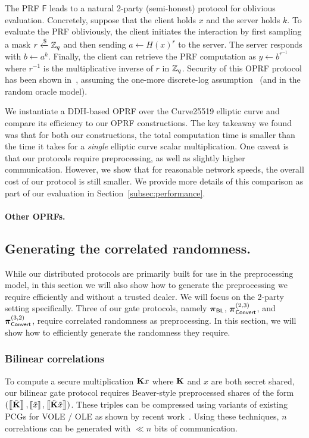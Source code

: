 The PRF $\mathsf{F}$ leads to a natural 2-party (semi-honest) protocol for oblivious evaluation. Concretely, suppose that the client holds $x$ and the server holds $k$. To evaluate the PRF obliviously, the client initiates the interaction by first sampling a mask $r \xleftarrow{\$} \mathbb{Z}_q$ and then sending $a \gets H(x)^r$ to the server. The server responds with $b \gets a^k$. Finally, the client can retrieve the PRF computation as $y \gets b^{r^{-1}}$ where $r^{-1}$ is the multiplicative inverse of $r$ in $\mathbb{Z}_q$. Security of this OPRF protocol has been shown in~\cite{jarecki2014-ddhoprf,jarecki2016-ddhoprf}, assuming the one-more discrete-log assumption~\cite{bellare2003-onemore} (and in the random oracle model).

We instantiate a DDH-based OPRF over the Curve25519 elliptic curve and compare its efficiency to our OPRF constructions. The key takeaway we found was that for both our constructions, the total computation time is smaller than the time it takes for a \textit{single} elliptic curve scalar multiplication. One caveat is that our protocols require preprocessing, as well as slightly higher communication. However, we show that for reasonable network speeds, the overall cost of our protocol is still smaller. We provide more details of this comparison as part of our evaluation in Section~\ref{subsec:performance}.


\paragraph{Other OPRFs.}



\subsection{Generating the correlated randomness.}
\label{subsec:preprocessing}
While our distributed protocols are primarily built for use in the preprocessing model, in this section we will also show how to generate the preprocessing we require efficiently and without a trusted dealer. We will focus on the 2-party setting specifically. Three of our gate protocols, namely $\boldsymbol{\pi}_{\textnormal{\textsf{BL}}}$, $\boldsymbol{\pi}_{\textnormal{\textsf{Convert}}}^{(2,3)}$, and $\boldsymbol{\pi}_{\textnormal{\textsf{Convert}}}^{(3,2)}$, require correlated randomness as preprocessing. In this section, we will show how to efficiently generate the randomness they require.


\subsubsection{Bilinear correlations}
To compute a secure multiplication $\mat{K}x$ where $\mat{K}$ and $x$ are both secret shared, our bilinear gate protocol requires Beaver-style preprocessed shares of the form $(\share{\tilde{\mat{K}}}, \share{\tilde{x}}, \share{\tilde{\mat{K}}\tilde{x}})$. These triples can be compressed using variants of existing PCGs for VOLE / OLE as shown by recent work~\cite{boyle2019-pcg, boyle2020-lpn-pcg}. Using these techniques, $n$ correlations can be generated with $\ll n$ bits of communication.


